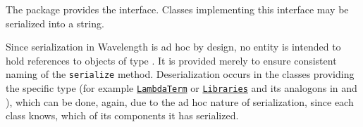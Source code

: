 The \texttt{} package provides the \texttt{}
interface. Classes implementing this interface may be serialized into a string.

Since serialization in Wavelength is ad hoc by design, no entity is intended to hold
references to objects of type \texttt{}. It is provided merely to
ensure consistent naming of the \texttt{serialize} method. Deserialization occurs
in the classes providing the specific type (for example \texttt{\hyperref[type:edu.kit.wavelength.client.model.term.LambdaTerm]{LambdaTerm}}
or \texttt{\hyperref[type:edu.kit.wavelength.client.model.library.Libraries]{Libraries}} and its analogons in \texttt{}
and \texttt{}), which can be done, again, due to the ad hoc nature
of serialization, since each class knows, which of its components it has serialized.
